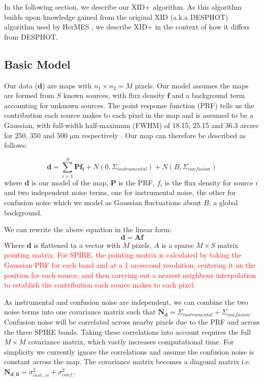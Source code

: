 \documentclass[useAMS,usenatbib]{mnras}
\begin{document}
In the following section, we describe our \textsc{XID+} algorithm. As this algorithm builds upon knowledge gained from the original XID (a.k.a \textsc{DESPHOT}) algorithm used by HerMES \citep{Roseboom:2010, Roseboom:2011, Wang:2014}, we describe XID+ in the context of how it differs from \textsc{DESPHOT}. 


\subsection{Basic Model}
Our data ($\mathbf{d}$) are maps with $n_1 \times n_2 = M$ pixels. Our model assumes the maps are formed from $S$ known sources, with flux density $\mathbf{f}$ and a background term accounting for unknown sources. The point response function (PRF) tells us the contribution each source makes to each pixel in the map and is assumed to be a Gaussian, with full-width half-maximum (FWHM) of 18.15, 25.15 and 36.3 arcsec for 250, 350 and 500 $\mathrm{\mu m}$ respectively \citep{Griffin:2010}. Our map can therefore be described as follows:

\begin{equation}
\mathbf{d} = \sum\limits_{i=1}^S \mathbf{P f_i} + N(0,\Sigma_{instrumental}) + N(B,\Sigma_{confusion})
\label{eq:map}
\end{equation}
where $\mathbf{d}$ is our model of the map, $\mathbf{P}$ is the PRF, $f_i$ is the flux density for source $i$ and two independent noise terms, one for instrumental noise, the other for confusion noise which we model as Gaussian fluctuations about $B$, a global background.

We can rewrite the above equation in the linear form:
\begin{equation}
\mathbf{d} = \mathbf{Af}
\label{eq:map2}
\end{equation}
Where $\mathbf{d}$ is flattened ta a vector with $M$ pixels, $A$ is a sparse $M \times S$ matrix \textcolor{red}{ pointing matrix. For SPIRE, the pointing matrix is calculated by taking the Gaussian PRF for each band and at a 1 arcsecond resolution, centering it on the position for each source, and then carrying out a nearest neighbour interpolation to establish the contribution each source makes to each pixel.}

As instrumental and confusion noise are independent, we can combine the two noise terms into one covariance matrix such that $\mathbf{N_d} = \Sigma_{instrumental}+\Sigma_{confusion}$. Confusion noise will be correlated across nearby pixels due to the PRF and across the three SPIRE bands. Taking these correlations into account requires the full $M \times M$ covariance matrix, which vastly increases computational time. For simplicity we currently ignore the correlations and assume the confusion noise is constant across the map. The covariance matrix becomes a diagonal matrix i.e. $\mathbf{N_{d,ii}} =\sigma_{inst.,ii}^2+\sigma_{conf.}^2$. 
\end{document}
